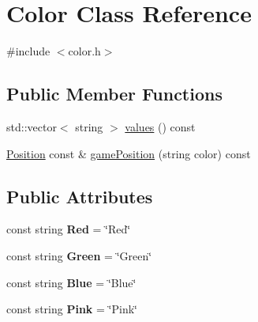 \hypertarget{class_color}{}\section{Color Class Reference}
\label{class_color}


{\ttfamily \#include $<$color.\+h$>$}

\subsection*{Public Member Functions}
\begin{DoxyCompactItemize}
\item 
std\+::vector$<$ string $>$ \mbox{\hyperlink{class_color_a0c7d2ce54b76091762d9a5f5208fee0f}{values}} () const
\item 
\mbox{\hyperlink{class_position}{Position}} const  \& \mbox{\hyperlink{class_color_a3ed137f01f42dd119231203ad018fa68}{game\+Position}} (string color) const
\end{DoxyCompactItemize}
\subsection*{Public Attributes}
\begin{DoxyCompactItemize}
\item 
\mbox{\label{class_color_a9d5598d7098808cda840ab9f7fef70a3}} 
const string {\bfseries Red} = \char`\"{}Red\char`\"{}
\item 
\mbox{\label{class_color_a5711d08d7c0cf050efef913f5cdfad57}} 
const string {\bfseries Green} = \char`\"{}Green\char`\"{}
\item 
\mbox{\label{class_color_a1a9b380205041ce30a49a6f52c97900f}} 
const string {\bfseries Blue} = \char`\"{}Blue\char`\"{}
\item 
\mbox{\label{class_color_a883e4ed150ec768d6954c69e67f6ee5e}} 
const string {\bfseries Pink} = \char`\"{}Pink\char`\"{}
\end{DoxyCompactItemize}
